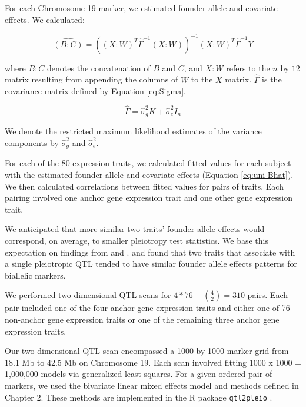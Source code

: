 \documentclass{article}
\begin{document}
For each Chromosome 19 marker, we estimated founder allele and covariate effects. We calculated:

\begin{equation}\label{eq:uni-Bhat}
\widehat {(B:C)} = \left((X:W)^T\hat\Gamma^{-1}(X:W)\right)^{-1}(X:W)^T\hat\Gamma^{-1}Y
\end{equation}

\noindent where $B:C$ denotes the concatenation of $B$ and $C$, and $X:W$ refers to the $n$ by $12$ matrix resulting from appending the columns of $W$ to the $X$ matrix. $\hat\Gamma$ is the covariance matrix defined by Equation \ref{eq:Sigma}.

\begin{equation}\label{eq:Sigma}
\hat \Gamma = \hat\sigma_g^2 K + \hat \sigma_e^2 I_n
\end{equation}

\noindent We denote the restricted maximum likelihood estimates of the variance components by $\hat \sigma_g^2$ and $\hat \sigma_e^2$. 


For each of the 80 expression traits, we calculated fitted values for each subject with the estimated founder allele and covariate effects (Equation \ref{eq:uni-Bhat}). We then calculated correlations between fitted values for pairs of traits. Each pairing involved one anchor gene expression trait and one other gene expression trait. 

We anticipated that more similar two traits' founder allele effects would correspond, on average, to smaller pleiotropy test statistics. We base this expectation on findings from \citet{macdonald2007joint} and \citet{king2012genetic}. \citet{macdonald2007joint} and \citet{king2012genetic} found that two traits that associate with a single pleiotropic QTL tended to have similar founder allele effects patterns for biallelic markers.

We performed two-dimensional QTL scans for $4 * 76 + \binom{4}{2} = 310$ pairs. Each pair included one of the four anchor gene expression traits and either one of 76 non-anchor gene expression traits or one of the remaining three anchor gene expression traits. 

Our two-dimensional QTL scan encompassed a 1000 by 1000 marker grid from 18.1 Mb to 42.5 Mb on Chromosome 19. Each scan involved fitting 1000 x 1000 = 1,000,000 models via generalized least squares. For a given ordered pair of markers, we used the bivariate linear mixed effects model and methods defined in Chapter 2. These methods are implemented in the R package \texttt{qtl2pleio} \citep{qtl2pleio}.
\end{document}

